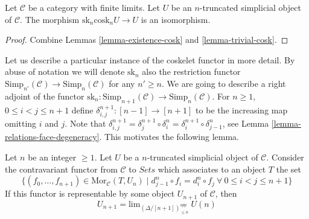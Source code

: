 \begin{lemma}
\label{lemma-recover-cosk}
Let $\mathcal{C}$ be a category with finite limits.
Let $U$ be an $n$-truncated simplicial object of $\mathcal{C}$.
The morphism $\text{sk}_n \text{cosk}_n U \to U$
is an isomorphism.
\end{lemma}

\begin{proof}
Combine Lemmas \ref{lemma-existence-cosk} and \ref{lemma-trivial-cosk}.
\end{proof}

\noindent
Let us describe a particular instance of the coskelet functor in more detail.
By abuse of notation we will denote $\text{sk}_n$
also the restriction functor
$\text{Simp}_{n'}(\mathcal{C}) \to \text{Simp}_n(\mathcal{C})$
for any $n' \geq n$. We are going to describe a right adjoint
of the functor
$\text{sk}_n : \text{Simp}_{n + 1}(\mathcal{C})
\to \text{Simp}_n(\mathcal{C})$.
For $n \geq 1$, $0 \leq i < j \leq n + 1$
define $\delta^{n + 1}_{i,j} : [n - 1] \to [n + 1]$
to be the increasing map omitting $i$ and $j$.
Note that
$\delta^{n + 1}_{i,j} =
\delta^{n + 1}_j \circ \delta^n_i =
\delta^{n + 1}_i \circ \delta^n_{j - 1}$, see
Lemma \ref{lemma-relations-face-degeneracy}. This motivates
the following lemma.

\begin{lemma}
\label{lemma-formula-limit}
Let $n$ be an integer $\geq 1$.
Let $U$ be a $n$-truncated simplicial object of $\mathcal{C}$.
Consider the contravariant functor from $\mathcal{C}$ to
$\textit{Sets}$ which associates to an object $T$ the set
$$
\{ (f_0,\ldots,f_{n + 1}) \in \text{Mor}_{\mathcal{C}}(T, U_n)
\mid
d^n_{j - 1} \circ f_i = d^n_i \circ f_j\ 
\forall\ 0\leq i < j\leq n + 1\}
$$
If this functor is representable by some object $U_{n + 1}$
of $\mathcal{C}$, then
$$
U_{n + 1} = \text{lim}_{(\Delta/[n + 1])_{\leq n}^{opp}}\ U(n)
$$
\end{lemma}


